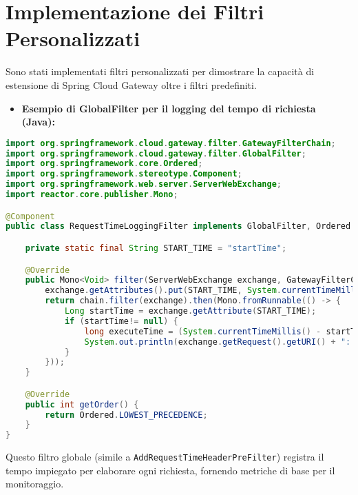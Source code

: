 \section{Implementazione dei Filtri Personalizzati}
Sono stati implementati filtri personalizzati per dimostrare la capacità di estensione di Spring Cloud Gateway oltre i filtri predefiniti.
\begin{itemize}
    \item \textbf{Esempio di GlobalFilter per il logging del tempo di richiesta (Java):}
\end{itemize}
\begin{lstlisting}[language=Java, style=JavaStyle, caption=RequestTimeLoggingFilter.java]
import org.springframework.cloud.gateway.filter.GatewayFilterChain;
import org.springframework.cloud.gateway.filter.GlobalFilter;
import org.springframework.core.Ordered;
import org.springframework.stereotype.Component;
import org.springframework.web.server.ServerWebExchange;
import reactor.core.publisher.Mono;

@Component
public class RequestTimeLoggingFilter implements GlobalFilter, Ordered {

    private static final String START_TIME = "startTime";

    @Override
    public Mono<Void> filter(ServerWebExchange exchange, GatewayFilterChain chain) {
        exchange.getAttributes().put(START_TIME, System.currentTimeMillis());
        return chain.filter(exchange).then(Mono.fromRunnable(() -> {
            Long startTime = exchange.getAttribute(START_TIME);
            if (startTime!= null) {
                long executeTime = (System.currentTimeMillis() - startTime);
                System.out.println(exchange.getRequest().getURI() + ": " + executeTime + "ms");
            }
        }));
    }

    @Override
    public int getOrder() {
        return Ordered.LOWEST_PRECEDENCE;
    }
}
\end{lstlisting}
Questo filtro globale (simile a \texttt{AddRequestTimeHeaderPreFilter}) registra il tempo impiegato per elaborare ogni richiesta, fornendo metriche di base per il monitoraggio.


